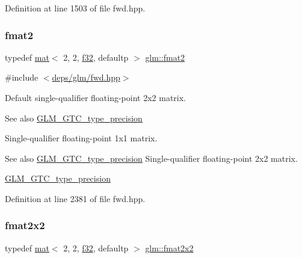Definition at line 1503 of file fwd.\+hpp.

\mbox{\label{group__gtc__type__precision_ga687a2fb53c536086879726d0c0f88a8b}} 
\subsubsection{\texorpdfstring{fmat2}{fmat2}}
{\footnotesize\ttfamily typedef \hyperlink{structglm_1_1mat}{mat}$<$ 2, 2, \hyperlink{group__gtc__type__precision_ga0ec999b57f5330d9021256e96038df04}{f32}, defaultp $>$ \hyperlink{group__gtc__type__precision_ga687a2fb53c536086879726d0c0f88a8b}{glm\+::fmat2}}



{\ttfamily \#include $<$\hyperlink{fwd_8hpp}{deps/glm/fwd.\+hpp}$>$}

Default single-\/qualifier floating-\/point 2x2 matrix. \begin{DoxySeeAlso}{See also}
\hyperlink{group__gtc__type__precision}{G\+L\+M\+\_\+\+G\+T\+C\+\_\+type\+\_\+precision}
\end{DoxySeeAlso}
Single-\/qualifier floating-\/point 1x1 matrix. \begin{DoxySeeAlso}{See also}
\hyperlink{group__gtc__type__precision}{G\+L\+M\+\_\+\+G\+T\+C\+\_\+type\+\_\+precision} Single-\/qualifier floating-\/point 2x2 matrix. 

\hyperlink{group__gtc__type__precision}{G\+L\+M\+\_\+\+G\+T\+C\+\_\+type\+\_\+precision} 
\end{DoxySeeAlso}


Definition at line 2381 of file fwd.\+hpp.

\mbox{\label{group__gtc__type__precision_gad3b3ab6399b8b960e8994b37521bab86}} 
\subsubsection{\texorpdfstring{fmat2x2}{fmat2x2}}
{\footnotesize\ttfamily typedef \hyperlink{structglm_1_1mat}{mat}$<$ 2, 2, \hyperlink{group__gtc__type__precision_ga0ec999b57f5330d9021256e96038df04}{f32}, defaultp $>$ \hyperlink{group__gtc__type__precision_gad3b3ab6399b8b960e8994b37521bab86}{glm\+::fmat2x2}}



